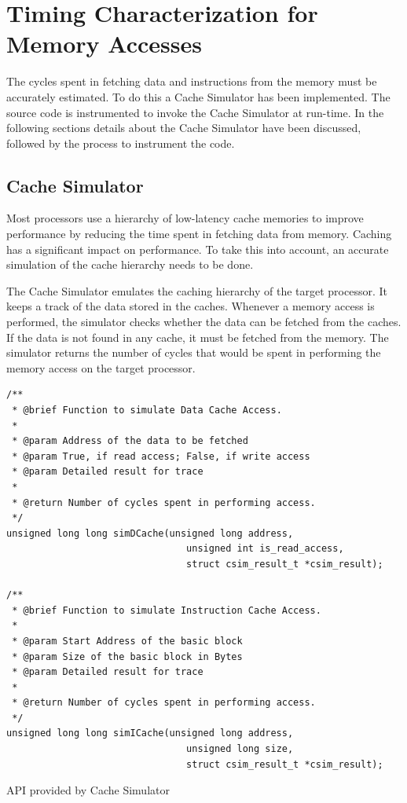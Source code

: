 \section{Timing Characterization for Memory Accesses}
\label{sec:AnnotMemAccess}
The cycles spent in fetching data and instructions from the memory must be accurately estimated. To do this a Cache Simulator has been implemented. The source code is instrumented to invoke the Cache Simulator at run-time. In the following sections details about the Cache Simulator have been discussed, followed by the process to instrument the code.

\subsection{Cache Simulator}
Most processors use a hierarchy of low-latency cache memories to improve performance by reducing the time spent in fetching data from memory. Caching has a significant impact on performance. To take this into account, an accurate simulation of the cache hierarchy needs to be done.

The Cache Simulator emulates the caching hierarchy of the target processor. It keeps a track of the data stored in the caches. Whenever a memory access is performed, the simulator checks whether the data can be fetched from the caches. If the data is not found in any cache, it must be fetched from the memory. The simulator returns the number of cycles that would be spent in performing the memory access on the target processor.

\begin{Snippet}[h!]
\begin{lstlisting}[numbers=none]
/**
 * @brief Function to simulate Data Cache Access.
 *
 * @param Address of the data to be fetched
 * @param True, if read access; False, if write access
 * @param Detailed result for trace
 *
 * @return Number of cycles spent in performing access.
 */
unsigned long long simDCache(unsigned long address,
                                unsigned int is_read_access,
                                struct csim_result_t *csim_result);
                                
/**
 * @brief Function to simulate Instruction Cache Access.
 *
 * @param Start Address of the basic block
 * @param Size of the basic block in Bytes
 * @param Detailed result for trace 
 *
 * @return Number of cycles spent in performing access.
 */
unsigned long long simICache(unsigned long address,
                                unsigned long size,
                                struct csim_result_t *csim_result);
\end{lstlisting}
\caption{API provided by Cache Simulator}
\label{snip:csimAPI}
\end{Snippet}


